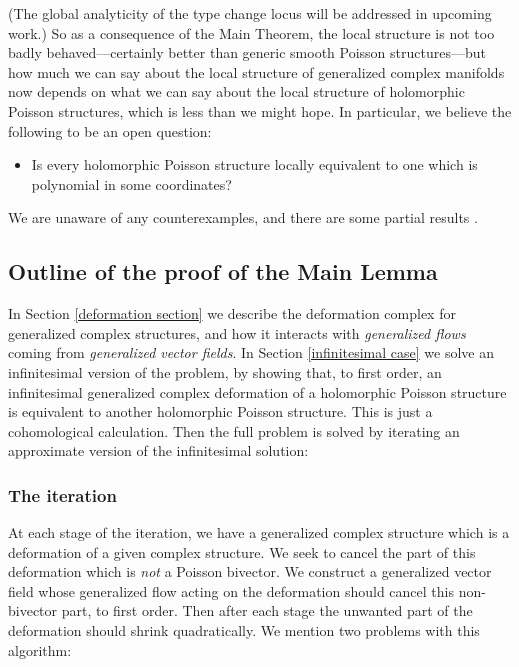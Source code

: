 \documentclass{article}
\begin{document}
(The global analyticity of the type change locus will be addressed in upcoming work.)  So as a consequence of the Main Theorem, the local structure is not too badly behaved---certainly better than generic smooth Poisson structures---but how much we can say about the local structure of generalized complex manifolds now depends on what we can say about the local structure of holomorphic Poisson structures, which is less than we might hope.  In particular, we believe the following to be an open question:
\begin{itemize}
\item Is every holomorphic Poisson structure locally equivalent to one which is polynomial in some coordinates?
\end{itemize}
We are unaware of any counterexamples, and there are some partial results \cite{DufourWade} \cite{Lohrmann}.


\subsection{Outline of the proof of the Main Lemma}\label{outline of proof}

In Section \ref{deformation section} we describe the deformation complex for generalized complex structures, and how it interacts with \emph{generalized flows} coming from \emph{generalized vector fields}.  In Section \ref{infinitesimal case} we solve an infinitesimal version of the problem, by showing that, to first order, an infinitesimal generalized complex deformation of a holomorphic Poisson structure is equivalent to another holomorphic Poisson structure.  This is just a cohomological calculation.  Then the full problem is solved by iterating an approximate version of the infinitesimal solution:

\subsubsection*{The iteration}

At each stage of the iteration, we have a generalized complex structure which is a deformation of a given complex structure.  We seek to cancel the part of this deformation which is \emph{not} a Poisson bivector.  We construct a generalized vector field whose generalized flow acting on the deformation should cancel this non-bivector part, to first order.  Then after each stage the unwanted part of the deformation should shrink quadratically.  We mention two problems with this algorithm:
\end{document}
